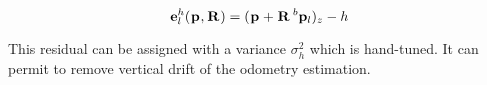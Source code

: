 \begin{equation}
    {\bf e}^h_l(\prescript{}{}{{\bf p}}_{}, \prescript{}{}{{\bf R}}_{}) = (\prescript{}{}{{\bf p}}_{} + \prescript{}{}{{\bf R}}_{} \prescript{b}{}{{\bf p}}_{l})_z - h
\end{equation}

This residual can be assigned with a variance $\sigma_h^2$ which is hand-tuned. It can permit to remove vertical drift of the odometry estimation.

